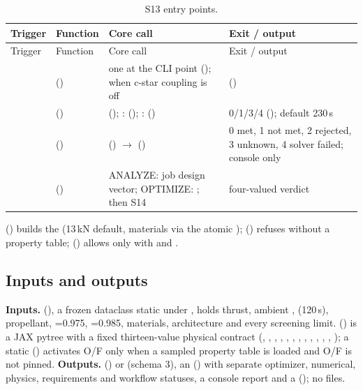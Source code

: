 {\footnotesize
\begin{longtable}{@{}P{2.9cm}P{3.6cm}P{5.7cm}P{3.6cm}@{}}
\caption{S13 entry points.}\label{tab:s13-entry}\\
\toprule
Trigger & Function & Core call & Exit / output\\
\midrule\endfirsthead
\toprule Trigger & Function & Core call & Exit / output\\ \midrule\endhead
{} &  () & one  at the CLI point ();  when c-star coupling is off &  ()\\
 &  () &  (); :  (); :  () & 0/1/3/4 ();  default 230\,s\\
 &  () &  () $\rightarrow$  () & 0 met, 1 not met, 2 rejected, 3 unknown, 4 solver failed; console only\\
 &  () & ANALYZE: job design vector; OPTIMIZE: ; then S14 & four-valued verdict\\
\bottomrule
\end{longtable}
}

 () builds the  (13\,kN default, materials via the atomic );  () refuses  without a property table;  () allows  only with  and .

\subsection{Inputs and outputs}\label{sec:s13-io}
\textbf{Inputs.}  (), a frozen dataclass static under , holds thrust, ambient ,  (120\,s), propellant, =0.975, =0.985, materials, architecture and every screening limit.  () is a JAX pytree with a fixed thirteen-value physical contract (, , , , , , , , , , , , ); a static  () activates O/F only when a sampled property table is loaded and O/F is not pinned.
\textbf{Outputs.}  () or  (schema 3), an  () with separate optimizer, numerical, physics, requirements and workflow statuses, a console report and a  (); no files.

